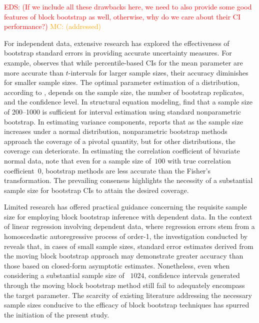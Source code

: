 \documentclass[10pt]{article}
\newcommand{\eds}[1]{\textcolor{red}{EDS: (#1)}}
\newcommand{\mc}[1]{\textcolor{orange}{MC: (#1)}}
\begin{document}
\eds{If we include all these drawbacks here, we need to also provide some good 
features of block bootstrap as well, otherwise, why do we care about their CI 
performance?}
\mc{addressed}

For independent data, extensive research has explored the effectiveness of
bootstrap standard errors in providing accurate uncertainty measures. For 
example, \citet{hesterberg2015teachers} observes that while percentile-based CIs 
for the mean parameter are more accurate than $t$-intervals for larger sample 
sizes, their accuracy diminishes for smaller sample sizes. The optimal parameter 
estimation of a distribution, according to \citet{chernick2009revisiting}, 
depends on the sample size, the number of bootstrap replicates, and the 
confidence level. In structural equation modeling, \citet{nevitt2001performance} 
find that a sample size of 200--1000 is sufficient for interval estimation using 
standard nonparametric bootstrap. In estimating variance components, 
\citet{burch2012nonparametric} reports that as the sample size increases under a 
normal distribution, nonparametric bootstrap methods approach the coverage of a 
pivotal quantity, but for other distributions, the coverage can deteriorate. In 
estimating the correlation coefficient of bivariate normal data, 
\citet{puth2015variety} note that even for a sample size of~$100$ with true 
correlation coefficient~0, bootstrap methods are less accurate than the Fisher's 
transformation. The prevailing consensus highlights the necessity of a 
substantial sample size for bootstrap CIs to attain the desired coverage.


Limited research has offered practical guidance concerning the requisite sample
size for employing block bootstrap inference with dependent data. In the context 
of linear regression involving dependent data, where regression errors stem from 
a homoscedastic autoregressive process of order-1, the investigation conducted 
by \citet{goncalves2005bootstrap} reveals that, in cases of small sample sizes, 
standard error estimates derived from the moving block bootstrap approach may 
demonstrate greater accuracy than those based on closed-form asymptotic 
estimates. Nonetheless, even when considering a substantial sample size of 
~$1024$, confidence intervals generated through the moving block bootstrap 
method still fail to adequately encompass the target parameter. The scarcity of 
existing literature addressing the necessary sample sizes conducive to the 
efficacy of block bootstrap techniques has spurred the initiation of the present 
study.
\end{document}

